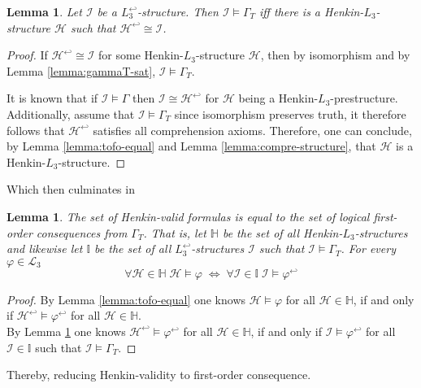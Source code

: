 \documentclass[11pt,a4paper]{article}
\newtheorem{lemma}[theorem]{Lemma}
\newcommand{\tofo}{\hookleftarrow}
\begin{document}
\begin{lemma}
\label{lemma:str-iso}
Let $\mathcal{I}$ be a $L_3^{\tofo}$-structure. Then $\mathcal{I} \models \Gamma_T$ iff there is a  Henkin-$L_3$-structure $\mathcal{H}$ such that $\mathcal{H}^{\tofo} \cong \mathcal{I}$.
\end{lemma}
\begin{proof}
If $\mathcal{H}^{\tofo} \cong \mathcal{I}$ for some Henkin-$L_3$-structure $\mathcal{H}$, then by isomorphism and by Lemma \ref{lemma:gammaT-sat}, $\mathcal{I} \models \Gamma_T$. 


It is known that if $\mathcal{I} \models \Gamma$ then $\mathcal{I} \cong \mathcal{H}^{\tofo}$ for $ \mathcal{H}$ being a Henkin-$L_3$-prestructure. Additionally, assume that $\mathcal{I} \models  \Gamma_T$ since isomorphism preserves truth, it therefore follows that  $ \mathcal{H}^{\tofo}$ satisfies all comprehension axioms. Therefore, one can conclude, by Lemma \ref{lemma:tofo-equal} and Lemma \ref{lemma:compre-structure}, that $\mathcal{H}$ is a Henkin-$L_3$-structure.
\end{proof}

Which then culminates in 
\begin{lemma}
\label{lemma:fo-equ}
The set of Henkin-valid formulas is equal to the set of logical first-order consequences from $\Gamma_T$. That is, let $\mathbb{H}$ be the set of all Henkin-$L_3$-structures and likewise let $\mathbb{I}$ be the set of all $L_3^{\tofo}$-structures $\mathcal{I}$ such that  $\mathcal{I} \models \Gamma_T $. For every $\varphi \in \mathcal{L}_3$ 
\begin{equation*}
\forall \mathcal{H} \in \mathbb{H} \; \mathcal{H} \models \varphi \; \iff \; \forall \mathcal{I} \in \mathbb{I} \; \mathcal{I} \models \varphi^{\tofo}
\end{equation*}
\end{lemma}
\begin{proof}
By Lemma \ref{lemma:tofo-equal} one knows $\mathcal{H}\models \varphi$ for all $\mathcal{H}\in \mathbb{H}$, if and only if $\mathcal{H}^{\tofo}\models \varphi^{\tofo}$ for all $\mathcal{H}\in \mathbb{H}$. \\
By Lemma \ref{lemma:str-iso} one knows $\mathcal{H}^{\tofo}\models \varphi^{\tofo}$ for all $\mathcal{H}\in \mathbb{H}$, if and only if $\mathcal{I}\models \varphi^{\tofo}$ for all $\mathcal{I}\in \mathbb{I}$ such that $\mathcal{I} \models \Gamma_T$.
\end{proof}
Thereby, reducing Henkin-validity to first-order consequence.\\
\end{document}
